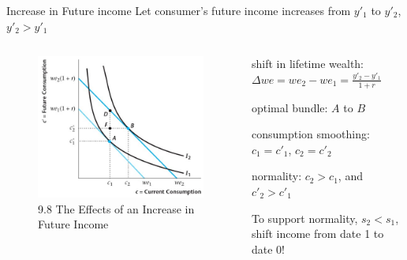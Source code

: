 \documentclass[11pt,aspectratio=169,usenames,dvipsnames]{beamer}
\let\tempone\itemize
\let\temptwo\enditemize
\renewenvironment{itemize}{\tempone\addtolength{\itemsep}{\fill}}{\temptwo}
\begin{document}
\begin{frame}{Increase in Future income}
\label{slide:Increase_in_Current_income}
    Let consumer's \alert{future} income increases from $ y'_1 $ to $ y'_{2}$, $ y'_{2} > y'_{1} $
    \begin{columns}
        \begin{column}{0.5\textwidth}
            \begin{figure}
                \caption{\scriptsize 9.8  The Effects of an Increase in Future Income}
                \includegraphics[width=.9\textwidth]{./figures/Figure9_8.jpg}
            \end{figure}
        \end{column}
        \begin{column}{0.5\textwidth}
            \begin{itemize}
                \item shift in lifetime wealth:
                        $ \displaystyle \Delta we = we_{2} - we_{1} = \frac{y'_{2} - y'_{1}}{1+r} $
                \item optimal bundle: $ A $ to $ B $
                \item consumption smoothing: $c_{1} = c'_{1}$, $c_{2} = c'_{2}$
                \item normality: $ c_{2} > c_{1} $, and $ c'_{2} > c'_{1} $
                \item To support normality, \alert{$ s_{2} < s_{1} $}, shift income from date 1 to date 0!
            \end{itemize}
        \end{column}
    \end{columns}
\end{frame}
\end{document}
